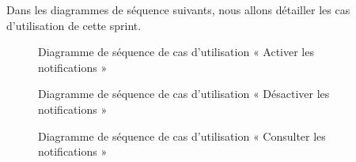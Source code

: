 Dans les diagrammes de séquence suivants, nous allons détailler les cas d'utilisation de cette sprint.

\begin{figure}[H]
  \centering
  \caption{Diagramme de séquence de cas d'utilisation « Activer les notifications »}
  \label{fig:sequence_activate_notification}
\end{figure}

\begin{figure}[H]
  \centering
  \caption{Diagramme de séquence de cas d'utilisation « Désactiver les notifications »}
  \label{fig:sequence_deactivate_notification}
\end{figure}

\begin{figure}[H]
  \centering
  \caption{Diagramme de séquence de cas d'utilisation « Consulter les notifications »}
  \label{fig:sequence_lister_notification}
\end{figure}

